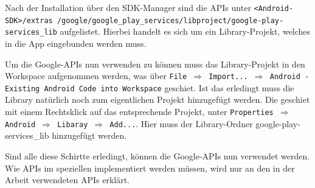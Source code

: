 Nach der Installation \"uber den \ac{SDK}-Manager sind die APIs unter \texttt{<Android-SDK>/extras /google/google\_play\_services/libproject/google-play-services\_lib} aufgelistet. Hierbei handelt es sich um ein Library-Projekt, welches in die App eingebunden werden muss.

Um die Google-APIs nun verwenden zu k\"onnen muss das Library-Projekt in den Workspace aufgenommen werden, was \"uber \texttt{File $\Rightarrow$ Import... $\Rightarrow$ Android - Existing Android Code into Workspace} geschiet. Ist das erledingt muss die Library nat\"urlich noch zum eigentlichen Projekt hinzugef\"ugt werden. Die geschiet mit einem Rechtsklick auf das entsprechende Projekt, unter \texttt{Properties $\Rightarrow$ Android $\Rightarrow$ Libaray $\Rightarrow$ Add...}. Hier muss der Library-Ordner google-play-services\_lib hinzugef\"ugt werden.

Sind alle diese Schirtte erledingt, k\"onnen die Google-APIs nun verwendet werden. Wie APIs im speziellen implementiert werden m\"ussen, wird nur an den in der Arbeit verwendeten APIs erkl\"art. \cite{Android44} \cite{GolemHBGoogleServices}